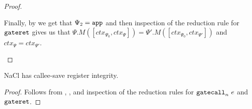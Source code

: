 \begin{proof}
\begin{itemize}
    Finally, by  we get that $\Psi_2 = \mathtt{app}$ and then inspection of the reduction rule for $\mathtt{gateret}$ gives us that $\Psi.M([ctx_{\Psi_0}, ctx_{\Psi}]) = \Psi'.M([ctx_{\Psi_0}, ctx_{\Psi'}])$ and $ctx_{\Psi} = ctx_{\Psi'}$.
  \end{itemize}
\end{proof}

\begin{proposition}
  NaCl has callee-save register integrity.
\end{proposition}
\begin{proof}
  Follows from , , and inspection of the reduction rules for $\mathtt{gatecall}_{n}\ {e}$ and $\mathtt{gateret}$.
\end{proof}


